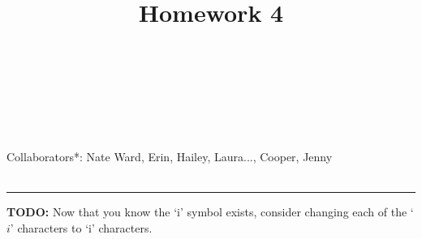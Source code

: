 \documentclass[10pt]{amsart}
\newcommand{\I}{\mathrm{i}}
\theoremstyle{nonumberplain}
\begin{document}
\pagestyle{empty}

\newcommand{\mline}{\vspace{.2in}\hrule\vspace{.2in}}

\noindent
{} \\
 \\
 \\
 \\

\title{\bf { Homework 4} }


\maketitle
\noindent
Collaborators*: Nate Ward, Erin, Hailey, Laura..., Cooper, Jenny \\
\\
\tiny
{}
\normalsize
\mline
\noindent
\textbf{TODO:} Now that you know the `$\I$' symbol exists, consider changing each of the `$i$' characters to `$\I$' characters.
\end{document}
